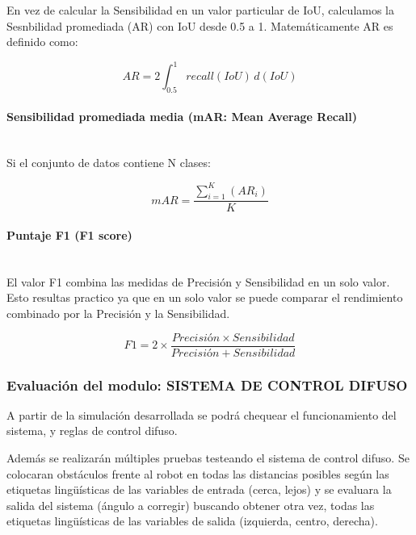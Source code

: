 En vez de calcular la Sensibilidad en un valor particular de IoU, calculamos la Sesnbilidad promediada (AR) con IoU desde 0.5 a 1.
Matemáticamente AR es definido como: 

\[ AR = 2 \int_{0.5}^{1} recall(IoU) \,d(IoU)  \]

\paragraph{Sensibilidad promediada media (mAR: Mean Average Recall)}\mbox{}\\

Si el conjunto de datos contiene N clases:

\[ mAR = \frac{ \sum_{i=1}^{K}(AR_{i})  }{ K}  \]

\paragraph{Puntaje F1 (F1 score)}\mbox{}\\

El valor F1 combina las medidas de Precisión y Sensibilidad en un solo valor. Esto resultas practico ya que en un solo valor se puede comparar el rendimiento combinado por la Precisión y la Sensibilidad.

\[ F1 = 2 \times \frac{Precisión \times Sensibilidad}{Precisión+Sensibilidad} \]


\subsubsection{Evaluación del modulo: SISTEMA DE CONTROL DIFUSO}

A partir de la simulación desarrollada se podrá chequear el funcionamiento del sistema, y reglas de control difuso.\par
Además se realizarán múltiples pruebas testeando el sistema de control difuso. Se colocaran obstáculos frente al robot en todas las distancias posibles según las etiquetas lingüísticas de las variables de entrada (cerca, lejos) y se evaluara la salida del sistema (ángulo a corregir) buscando obtener otra vez, todas las etiquetas lingüísticas de las variables de salida (izquierda, centro, derecha).